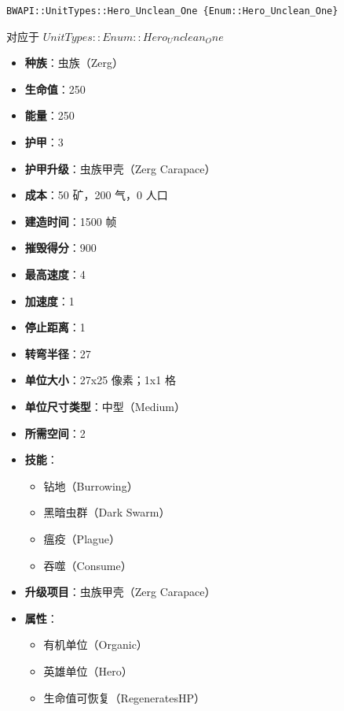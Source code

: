 \begin{tcolorbox}[colback=white, colframe=black!60!white, title=Hero\_Unclean\_One(), arc=0mm]
    \begin{verbatim}
BWAPI::UnitTypes::Hero_Unclean_One {Enum::Hero_Unclean_One}
    \end{verbatim}
    对应于  $ UnitTypes::Enum::Hero_Unclean_One $ 
    \begin{itemize}
        \item \textbf{种族}：虫族（Zerg）
        \item \textbf{生命值}：250
        \item \textbf{能量}：250
        \item \textbf{护甲}：3
        \item \textbf{护甲升级}：虫族甲壳（Zerg Carapace）
        \item \textbf{成本}：50 矿，200 气，0 人口
        \item \textbf{建造时间}：1500 帧
        \item \textbf{摧毁得分}：900
        \item \textbf{最高速度}：4
        \item \textbf{加速度}：1
        \item \textbf{停止距离}：1
        \item \textbf{转弯半径}：27
        \item \textbf{单位大小}：27x25 像素；1x1 格
        \item \textbf{单位尺寸类型}：中型（Medium）
        \item \textbf{所需空间}：2
        \item \textbf{技能}：
            \begin{itemize}
                \item 钻地（Burrowing）
                \item 黑暗虫群（Dark Swarm）
                \item 瘟疫（Plague）
                \item 吞噬（Consume）
            \end{itemize}
        \item \textbf{升级项目}：虫族甲壳（Zerg Carapace）
        \item \textbf{属性}：
            \begin{itemize}
                \item 有机单位（Organic）
                \item 英雄单位（Hero）
                \item 生命值可恢复（RegeneratesHP）
            \end{itemize}
    \end{itemize}
\end{tcolorbox}

